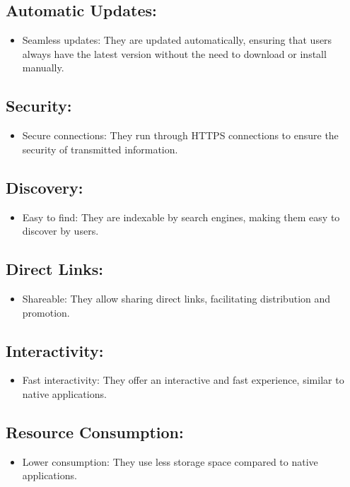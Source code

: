 \documentclass{article}
\begin{document}
\subsection*{Automatic Updates:}
\begin{itemize}
  \item Seamless updates: They are updated automatically, ensuring that users always have the latest version without the need to download or install manually.
\end{itemize}

\subsection*{Security:}
\begin{itemize}
  \item Secure connections: They run through HTTPS connections to ensure the security of transmitted information.
\end{itemize}

\subsection*{Discovery:}
\begin{itemize}
  \item Easy to find: They are indexable by search engines, making them easy to discover by users.
\end{itemize}

\subsection*{Direct Links:}
\begin{itemize}
  \item Shareable: They allow sharing direct links, facilitating distribution and promotion.
\end{itemize}

\subsection*{Interactivity:}
\begin{itemize}
  \item Fast interactivity: They offer an interactive and fast experience, similar to native applications.
\end{itemize}

\subsection*{Resource Consumption:}
\begin{itemize}
  \item Lower consumption: They use less storage space compared to native applications.
\end{itemize}
\end{document}
